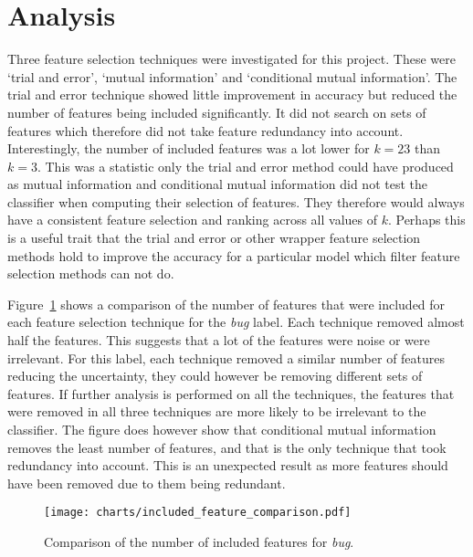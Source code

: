 \section{Analysis}
Three feature selection techniques were investigated for this project. These were `trial and error', `mutual information' and
`conditional mutual information'. The trial and error technique showed little improvement in accuracy but reduced the number of
features being included significantly. It did not search on sets of features which therefore did not take feature redundancy
into account. Interestingly, the number of included features was a lot lower for $k = 23$ than $k = 3$. This was a statistic
only the trial and error method could have produced as mutual information and conditional mutual information did not test the
classifier when computing their selection of features. They therefore would always have a consistent feature selection and
ranking across all values of $k$. Perhaps this is a useful trait that the trial and error or other wrapper feature selection
methods hold to improve the accuracy for a particular model which filter feature selection methods can not do.

Figure~\ref{fig:inc_feature_comparison_bug} shows a comparison of the number of features that were included for each feature
selection technique for the \textit{bug} label. Each technique removed almost half the features. This suggests that a lot of the
features were noise or were irrelevant. For this label, each technique removed a similar number of features reducing the
uncertainty, they could however be removing different sets of features. If further analysis is performed on all the techniques,
the features that were removed in all three techniques are more likely to be irrelevant to the classifier. The figure does
however show that conditional mutual information removes the least number of features, and that is the only technique that took
redundancy into account. This is an unexpected result as more features should have been removed due to them being redundant.

\begin{figure}[h]
    \centering
    \texttt{[image: charts/included\_feature\_comparison.pdf]}
    \caption{Comparison of the number of included features for \textit{bug}.}
    \label{fig:inc_feature_comparison_bug}
\end{figure}

